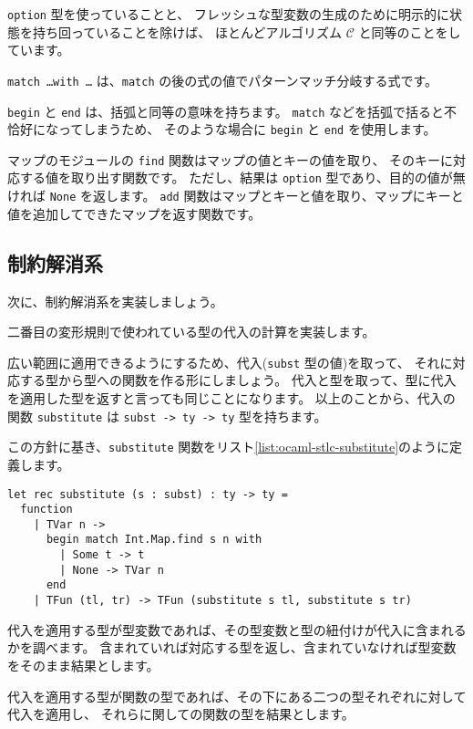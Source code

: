 \texttt{option} 型を使っていることと、
フレッシュな型変数の生成のために明示的に状態を持ち回っていることを除けば、
ほとんどアルゴリズム $\mathcal C$ と同等のことをしています。

\texttt{match \dots with \dots} は、\texttt{match} の後の式の値でパターンマッチ分岐する式です。

\texttt{begin} と \texttt{end} は、括弧と同等の意味を持ちます。
\texttt{match} などを括弧で括ると不恰好になってしまうため、
そのような場合に \texttt{begin} と \texttt{end} を使用します。

マップのモジュールの \texttt{find} 関数はマップの値とキーの値を取り、
そのキーに対応する値を取り出す関数です。
ただし、結果は \texttt{option} 型であり、目的の値が無ければ \texttt{None} を返します。
\texttt{add} 関数はマップとキーと値を取り、マップにキーと値を追加してできたマップを返す関数です。

\subsection{制約解消系}

次に、制約解消系を実装しましょう。

二番目の変形規則で使われている型の代入の計算を実装します。

広い範囲に適用できるようにするため、代入(\texttt{subst} 型の値)を取って、
それに対応する型から型への関数を作る形にしましょう。
代入と型を取って、型に代入を適用した型を返すと言っても同じことになります。
以上のことから、代入の関数 \texttt{substitute} は \texttt{subst -> ty -> ty} 型を持ちます。

この方針に基き、\texttt{substitute} 関数をリスト\ref{list:ocaml-stlc-substitute}のように定義します。

\begin{lstlisting}[caption=代入, label=list:ocaml-stlc-substitute]
let rec substitute (s : subst) : ty -> ty =
  function
    | TVar n ->
      begin match Int.Map.find s n with
        | Some t -> t
        | None -> TVar n
      end
    | TFun (tl, tr) -> TFun (substitute s tl, substitute s tr)
\end{lstlisting}

代入を適用する型が型変数であれば、その型変数と型の紐付けが代入に含まれるかを調べます。
含まれていれば対応する型を返し、含まれていなければ型変数をそのまま結果とします。

代入を適用する型が関数の型であれば、その下にある二つの型それぞれに対して代入を適用し、
それらに関しての関数の型を結果とします。


